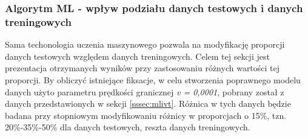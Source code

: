 \subsubsection{Algorytm ML - wpływ podziału danych testowych i danych treningowych}
\label{sssec:mldivide}
Sama techonologia uczenia maszynowego pozwala na modyfikację proporcji danych testowych względem danych treningowych. Celem tej sekcji jest prezentacja otrzymanych wyników przy zastosowaniu różnych wartości tej proporcji. By obliczyć istniejące fiksacje, w celu stworzenia poprawnego modelu danych użyto parametru prędkości granicznej \emph{v = 0,0001}, pobrany został z danych przedstawionych w sekcji \ref{sssec:mlivt}. Różnica w tych danych będzie badana przy stopniowym modyfikowaniu różnicy w proporcjach o 15\%, tzn. 20\%-35\%-50\% dla danych testowych, reszta danych treningowych.\par

